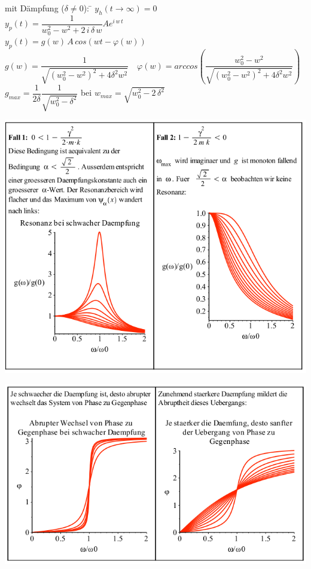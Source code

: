 \begin{tabbing}
mit Dämpfung ($\delta \neq 0$): \= $y_h(t \rightarrow \infty) = 0$\\
\> $y_p(t)= \dfrac{1}{w_0^2-w^2 + 2\,i\,\delta\,w}Ae^{i\,w\,t}$\\
\> $y_p(t)= g(w)\,A\,cos(wt-\varphi(w))$\\
\> $g(w)=\dfrac{1}{\sqrt{(w_0^2-w^2)^2+4\delta^2w^2}} \quad \varphi(w)=arccos(\dfrac{w_0^2-w^2}{\sqrt{(w_0^2-w^2)^2+4\delta^2w^2}})$\\
\> $g_{max}=\dfrac{1}{2\delta} \dfrac{1}{\sqrt{w_0^2-\delta^2}}$ bei $w_{max}=\sqrt{w_0^2-2\,\delta^2}$
\end{tabbing}
\begin{minipage}[h]{0.5\textwidth} 
	\includegraphics[width=1.0\textwidth]{images/Erzwungen1.png}
\end{minipage}
\begin{minipage}[h]{0.5\textwidth}
	\includegraphics[width=1.0\textwidth]{images/Erzwungen2.png}
\end{minipage}
